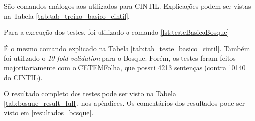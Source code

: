 São comandos análogos aos utilizados para CINTIL. Explicações podem ser vistas na Tabela \ref{tab:tab_treino_basico_cintil}.

Para a execução dos testes, foi utilizado o comando \ref{lst:testeBasicoBosque}
\begin{center}
    
\end{center}

É o mesmo comando explicado na Tabela \ref{tab:tab_teste_basico_cintil}. Também foi utilizado o \textit{10-fold validation} para o Bosque. Porém, os testes foram feitos majoritariamente com o CETEMFolha, que possui 4213 sentenças (contra 10140 do CINTIL).

O resultado completo dos testes pode ser visto na Tabela \ref{tab:bosque_result_full}, nos apêndices. Os comentários dos resultados pode ser visto em \ref{resultados_bosque}.
